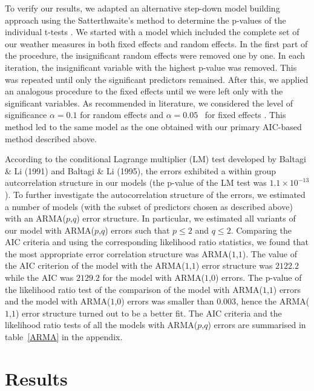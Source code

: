 \documentclass[12pt]{iopart}
\begin{document}
To verify our results, we adapted an alternative step-down model building
approach using the Satterthwaite’s method to determine the p-values of the individual
t-tests \cite{lmerTest}. We started with a model which included the complete set of our weather measures in both fixed effects and random effects. In the first part of the procedure, the insignificant random effects were removed one by one. In each iteration, the insignificant variable with the highest p-value was removed. This was repeated until only the significant predictors remained. After this, we applied an analogous procedure to the fixed effects until we were left only with the significant variables. As recommended in literature, we considered the level of significance $\alpha=0.1$ for random effects and $\alpha=0.05$~ for fixed effects \cite{lmerTest}. This method led to the same model as the one obtained with our primary AIC-based method described above.


According to the conditional Lagrange multiplier (LM) test developed by Baltagi \& Li (1991) and Baltagi \& Li (1995), the errors exhibited a within group autcorrelation structure in our models (the p-value of the LM test was $1.1\times10^{-13}$). To further investigate the autocorrelation structure of the errors, we estimated a number of models (with the subset of predictors chosen as described above) with an ARMA($p$,$q$) error structure. In particular, we estimated all variants of our model with ARMA($p$,$q$) errors such that $p\leq2$ and $q\leq2$. Comparing the AIC criteria and using the corresponding likelihood ratio statistics, we found that the most appropriate error correlation structure was ARMA($1$,$1$). The value of the AIC criterion of the model with the ARMA($1$,$1$) error structure was $2122.2$ while the AIC was $2129.2$ for the model with ARMA($1$,$0$) errors.  The p-value of the likelihood ratio test of the comparison of the model with ARMA($1$,$1$) errors and the model with ARMA($1$,$0$) errors was smaller than $0.003$, hence the ARMA($1$,$1$) error structure turned out to be a better fit. The AIC criteria and the likelihood ratio tests of all the models with ARMA($p$,$q$) errors are summarised in table~\ref{ARMA} in the appendix.



	\section{Results}\label{Results}
	
\end{document}
